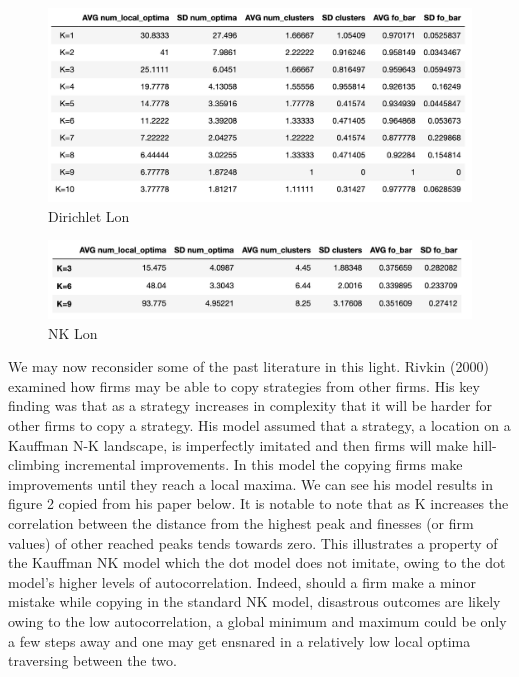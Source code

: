 \documentclass[11pt, oneside]{article}   	%
\begin{document}
\begin{figure}[h!]
  \caption{Dirichlet Lon}
  \includegraphics[width=1\textwidth]{Dirichlet_Lon.png}
\end{figure}

\begin{figure}[h!]
  \caption{NK Lon}
  \includegraphics[width=1\textwidth]{NK_Lon.png}
\end{figure}


We may now reconsider some of the past literature in this light. Rivkin (2000) examined how firms may be able to copy strategies from other firms. His key finding was that as a strategy increases in complexity that it will be harder for other firms to copy a strategy. His model assumed that a strategy, a location on a Kauffman N-K landscape, is imperfectly imitated and then firms will make hill-climbing incremental improvements. In this model the copying firms make improvements until they reach a local maxima. We can see his model results in figure 2 copied from his paper below. It is notable to note that as K increases the correlation between the distance from the highest peak and finesses (or firm values) of other reached peaks tends towards zero. This illustrates a property of the Kauffman NK model which the dot model does not imitate, owing to the dot model's higher levels of autocorrelation. Indeed, should a firm make a minor mistake while copying in the standard NK model, disastrous outcomes are likely owing to the low autocorrelation, a global minimum and maximum could be only a few steps away and one may get ensnared in a relatively low local optima traversing between the two.
\end{document}
